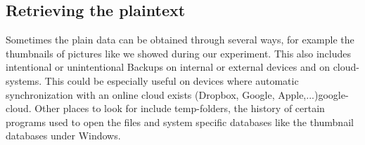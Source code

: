 \subsection{Retrieving the plaintext}
Sometimes the plain data can be obtained through several ways, for example the thumbnails of pictures like we showed during our experiment. This also includes intentional or unintentional Backups on internal or external devices and on cloud-systems.
This could be especially useful on devices where automatic synchronization with an online cloud exists (Dropbox, Google, Apple,...)google-cloud. Other places to look for include temp-folders, the history of certain programs used to open the files and system specific databases like the thumbnail databases under Windows.
